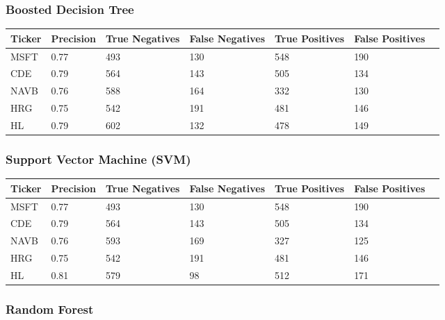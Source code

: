\subsubsection{Boosted Decision Tree}

\begin{center}
    \begin{tabular}{ | l | l | l | | l | l | l | p{5cm} |}
    \hline
    Ticker & Precision & True Negatives & False Negatives & True Positives & False Positives \\ \hline
    MSFT & 0.77 & 493 & 130 & 548 & 190 \\ \hline
    CDE & 0.79 & 564 & 143 & 505 & 134 \\ \hline
    NAVB & 0.76 & 588 & 164 & 332 & 130 \\ \hline
    HRG & 0.75 & 542 & 191 & 481 & 146 \\ \hline
    HL & 0.79 & 602 & 132 & 478 & 149 \\
    \hline
    \end{tabular}
\end{center}

\subsubsection{Support Vector Machine (SVM)}

\begin{center}
    \begin{tabular}{ | l | l | l | | l | l | l | p{5cm} |}
    \hline
    Ticker & Precision & True Negatives & False Negatives & True Positives & False Positives \\ \hline
    MSFT & 0.77 & 493 & 130 & 548 & 190 \\ \hline
    CDE & 0.79 & 564 & 143 & 505 & 134 \\ \hline
    NAVB & 0.76 & 593 & 169 & 327 & 125 \\ \hline
    HRG & 0.75 & 542 & 191 & 481 & 146 \\ \hline
    HL & 0.81 & 579 & 98 & 512 & 171 \\
    \hline
    \end{tabular}
\end{center}

\subsubsection{Random Forest}

